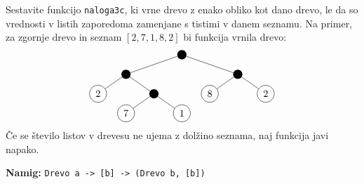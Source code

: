 \documentclass[arhiv]{../izpit}
\begin{document}
\podnaloga[10 točk]
  Sestavite funkcijo \verb|naloga3c|, ki vrne drevo z enako obliko kot dano drevo, le da so vrednosti v listih zaporedoma zamenjane s tistimi v danem seznamu. Na primer, za zgornje drevo in seznam $[2,7,1,8,2]$ bi funkcija vrnila drevo:
  \[
  \begin{tikzpicture}[level distance=0.7cm,
    level 1/.style={sibling distance=4cm},
    level 2/.style={sibling distance=2cm},
    level 3/.style={sibling distance=2cm}
    ]
    \node[circle, fill] (d) {}
      child {node[circle, fill] {}
        child {node[circle, draw] {2}}
        child {node[circle, fill] {}
          child {node[circle, draw] {7}}
          child {node[circle, draw] {1}}
        }
      }
      child {node[circle, fill] {}
        child {node[circle, draw] {8}}
        child {node[circle, draw] {2}}
      };
  \end{tikzpicture}
\]
Če se število listov v drevesu ne ujema z dolžino seznama, naj funkcija javi napako.

  \noindent
  \textbf{Namig:} \verb|Drevo a -> [b] -> (Drevo b, [b])|
\end{document}
